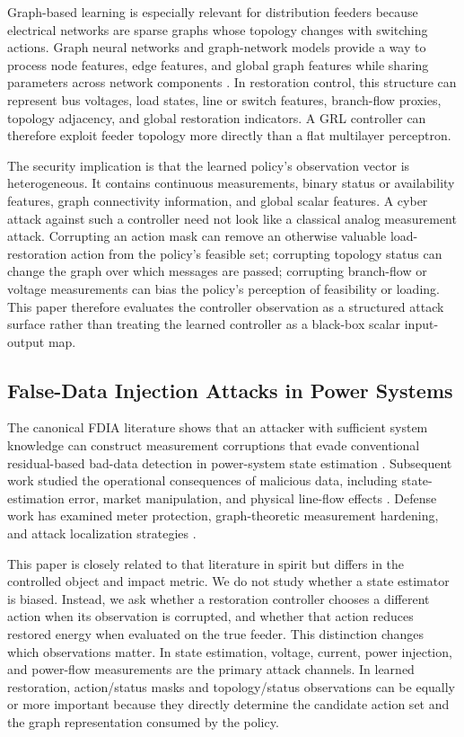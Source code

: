 Graph-based learning is especially relevant for distribution feeders because electrical networks are sparse graphs whose topology changes with switching actions. Graph neural networks and graph-network models provide a way to process node features, edge features, and global graph features while sharing parameters across network components \cite{kipf2017gcn,battaglia2018graphNetworks}. In restoration control, this structure can represent bus voltages, load states, line or switch features, branch-flow proxies, topology adjacency, and global restoration indicators. A GRL controller can therefore exploit feeder topology more directly than a flat multilayer perceptron.

The security implication is that the learned policy's observation vector is heterogeneous. It contains continuous measurements, binary status or availability features, graph connectivity information, and global scalar features. A cyber attack against such a controller need not look like a classical analog measurement attack. Corrupting an action mask can remove an otherwise valuable load-restoration action from the policy's feasible set; corrupting topology status can change the graph over which messages are passed; corrupting branch-flow or voltage measurements can bias the policy's perception of feasibility or loading. This paper therefore evaluates the controller observation as a structured attack surface rather than treating the learned controller as a black-box scalar input-output map.

\subsection{False-Data Injection Attacks in Power Systems}

The canonical FDIA literature shows that an attacker with sufficient system knowledge can construct measurement corruptions that evade conventional residual-based bad-data detection in power-system state estimation \cite{liu2009false}. Subsequent work studied the operational consequences of malicious data, including state-estimation error, market manipulation, and physical line-flow effects \cite{kosut2011malicious,xie2011false}. Defense work has examined meter protection, graph-theoretic measurement hardening, and attack localization strategies \cite{bi2014graphical}.

This paper is closely related to that literature in spirit but differs in the controlled object and impact metric. We do not study whether a state estimator is biased. Instead, we ask whether a restoration controller chooses a different action when its observation is corrupted, and whether that action reduces restored energy when evaluated on the true feeder. This distinction changes which observations matter. In state estimation, voltage, current, power injection, and power-flow measurements are the primary attack channels. In learned restoration, action/status masks and topology/status observations can be equally or more important because they directly determine the candidate action set and the graph representation consumed by the policy.

